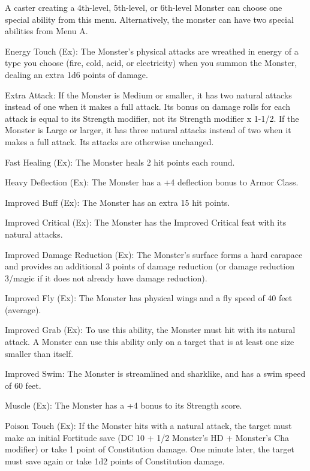 A caster creating a 4th-level, 5th-level, or 6th-level Monster 
can choose one special ability from this menu. 
Alternatively, the monster can have two special abilities from Menu A.
\begin{list}{}{\leftmargin=1em}
\item Energy Touch (Ex): The Monster's physical attacks are wreathed in energy of a type you choose 
(fire, cold, acid, or electricity) when you summon the Monster, dealing an extra 1d6 points of damage.
\item Extra Attack: If the Monster is Medium or smaller, 
it has two natural attacks instead of one when it makes a full attack. 
Its bonus on damage rolls for each attack is equal to its Strength modifier, 
not its Strength modifier x 1-1/2. If the Monster is Large or larger, 
it has three natural attacks instead of two when it makes a full attack. Its attacks are otherwise unchanged. 
\item Fast Healing (Ex): The Monster heals 2 hit points each round. 
\item Heavy Deflection (Ex): The Monster has a +4 deflection bonus to Armor Class.
\item Improved Buff (Ex): The Monster has an extra 15 hit points.
\item Improved Critical (Ex): The Monster has the Improved Critical feat with its natural attacks.
\item Improved Damage Reduction (Ex): The Monster's surface forms a 
hard carapace and provides an additional 3 points of damage reduction 
(or damage reduction 3/magic if it does not already have damage reduction).
\item Improved Fly (Ex): The Monster has physical wings and a fly speed of 40 feet (average).
\item Improved Grab (Ex): To use this ability, the Monster must hit with its natural attack. 
A Monster can use this ability only on a target that is at least one size smaller than itself. 
\item Improved Swim: The Monster is streamlined and sharklike, and has a swim speed of 60 feet.
\item Muscle (Ex): The Monster has a +4 bonus to its Strength score.
\item Poison Touch (Ex): If the Monster hits with a natural attack, 
the target must make an initial Fortitude save (DC 10 + 1/2 Monster's HD + Monster's Cha modifier) 
or take 1 point of Constitution damage. 
One minute later, the target must save again or take 1d2 points of Constitution damage.

\end{list}
